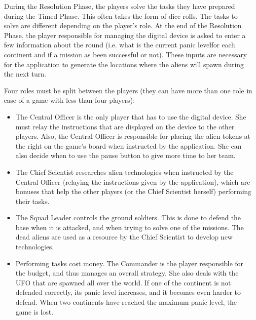 During the Resolution Phase, the players solve the tasks they have prepared during the Timed Phase. This often takes the form of dice rolls. The tasks to solve are different depending on the player's role. At the end of the Resolution Phase, the player responsible for managing the digital device is asked to enter a few information about the round (i.e. what is the current panic levelfor each continent and if a mission as been successful or not). These inputs are necessary for the application to generate the locations where the aliens will spawn during the next turn. 

Four roles must be split between the players (they can have more than one role in case of a game with less than four players):

\begin{itemize}
\item The Central Officer is the only player that has to use the digital device. She must relay the instructions that are displayed on the device to the other players. Also, the Central Officer is responsible for placing the alien tokens at the right on the game's board when instructed by the application. She can also decide when to use the pause button to give more time to her team.
\item The Chief Scientist researches alien technologies when instructed by the Central Officer (relaying the instructions given by the application), which are bonuses that help the other players (or the Chief Scientist herself) performing their tasks.
\item The Squad Leader controls the ground soldiers. This is done to defend the base when it is attacked, and when trying to solve one of the missions. The dead aliens are used as a resource by the Chief Scientist to develop new technologies.
\item Performing tasks cost money. The Commander is the player responsible for the budget, and thus manages an overall strategy. She also deals with the UFO that are spawned all over the world. If one of the continent is not defended correctly, its panic level increases, and it becomes even harder to defend. When two continents have reached the maximum panic level, the game is lost.
\end{itemize}

